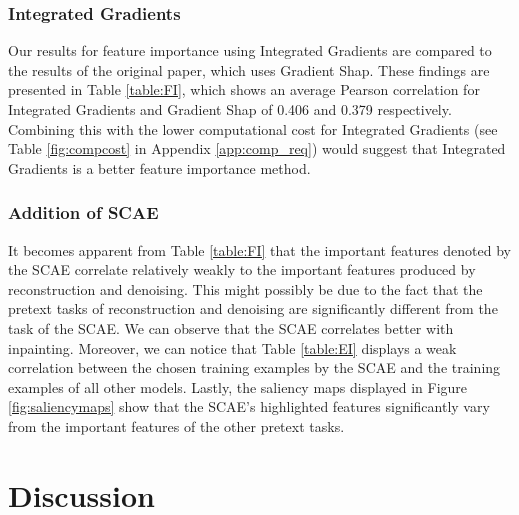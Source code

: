 \subsubsection{Integrated Gradients} 
Our results for feature importance using Integrated Gradients are compared to the results of the original paper, which uses Gradient Shap. These findings are presented in Table \ref{table:FI}, which shows an average Pearson correlation for Integrated Gradients and Gradient Shap of 0.406 and 0.379 respectively. Combining this with the lower computational cost for Integrated Gradients (see Table \ref{fig:compcost} in Appendix \ref{app:comp_req}) would suggest that Integrated Gradients is a better feature importance method.

\subsubsection{Addition of SCAE} It becomes apparent from Table \ref{table:FI} that the important features denoted by the SCAE correlate relatively weakly to the important features produced by reconstruction and denoising. This might possibly be due to the fact that the pretext tasks of reconstruction and denoising are significantly different from the task of the SCAE. We can observe that the SCAE correlates better with inpainting. Moreover, we can notice that Table \ref{table:EI} displays a weak correlation between the chosen training examples by the SCAE and the training examples of all other models. Lastly, the saliency maps displayed in Figure \ref{fig:saliencymaps} show that the SCAE's highlighted features significantly vary from the important features of the other pretext tasks. 

\section{Discussion}


